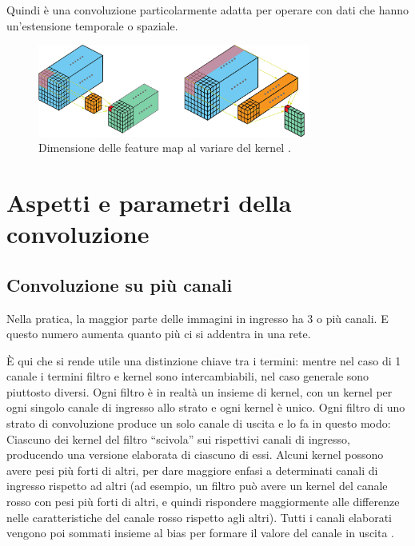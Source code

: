 Quindi è una convoluzione particolarmente adatta per operare con dati che hanno 
un'estensione temporale o spaziale.

\begin{figure}[H]
    \centering
    \includegraphics[width=0.8\textwidth]{Immagini/Generiche/Dimensione_kernel_con_3D.png}
    \caption{Dimensione delle feature map al variare del kernel \cite{Paragone_size_3D_kernel}.}
    \label{fig:size_3D_kernel}
\end{figure} 


\section{Aspetti e parametri della convoluzione}
\subsection{Convoluzione su più canali}
Nella pratica, la maggior parte delle immagini in ingresso ha 3 o più canali.
E questo numero aumenta quanto più ci si addentra in una rete. 

È qui che si rende utile una distinzione chiave tra i termini: mentre nel caso di 
1 canale i termini filtro e kernel sono intercambiabili, nel caso generale sono 
piuttosto diversi. Ogni filtro è in realtà un insieme di kernel, con un kernel 
per ogni singolo canale di ingresso allo strato e ogni kernel è unico.
Ogni filtro di uno strato di convoluzione produce un solo canale di uscita e lo fa 
in questo modo: Ciascuno dei kernel del filtro “scivola” sui rispettivi canali di 
ingresso, producendo una versione elaborata di ciascuno di essi.
Alcuni kernel possono avere pesi più forti di altri, per dare maggiore enfasi a 
determinati canali di ingresso rispetto ad altri 
(ad esempio, un filtro può avere un kernel del canale rosso con pesi più forti di 
altri, e quindi rispondere maggiormente alle differenze nelle caratteristiche del 
canale rosso rispetto agli altri).
Tutti i canali elaborati vengono poi sommati insieme al bias per formare il valore 
del canale in uscita \cite{ASPETTI_CONVOLUZIONE_2,ELEMENTI_CNN_1}.





